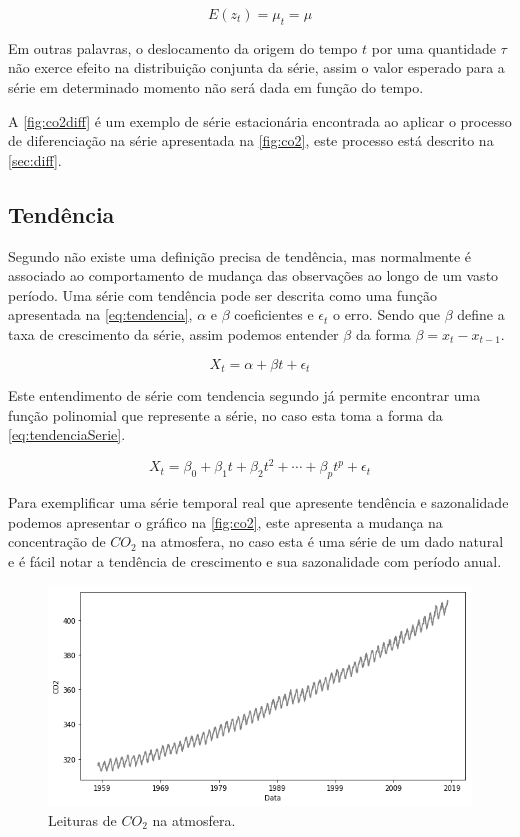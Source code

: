 \documentclass[
    12pt,
    oneside,
    a4paper,
    english,
    brazil
]{abntex2}
\begin{document}
\begin{equation}
    \label{eq:westacionaria}
    E(z_t) = \mu_t = \mu
\end{equation}

Em outras palavras, o deslocamento da origem do tempo $t$ por uma quantidade
$\tau$ não exerce efeito na distribuição conjunta da série, assim o valor
esperado para a série em determinado momento não será dada em função do tempo.

A \autoref{fig:co2diff} é um exemplo de série estacionária encontrada ao
aplicar o processo de diferenciação na série apresentada na \autoref{fig:co2},
este processo está descrito na \autoref{sec:diff}.

\subsection{Tendência}

Segundo  não existe uma definição precisa de tendência, mas
normalmente é associado ao comportamento de mudança das observações ao longo de
um vasto período. Uma série com tendência pode ser descrita como uma função
apresentada na \autoref{eq:tendencia}, $\alpha$ e $\beta{}$ coeficientes e
$\epsilon{}_t$ o erro. Sendo que $\beta{}$ define a taxa de crescimento da
série, assim podemos entender $\beta$ da forma $\beta = x_t - x_{t-1}$.

\begin{equation}
    \label{eq:tendencia}
    X_t = \alpha + \beta{}t + \epsilon{}_t
\end{equation}

Este entendimento de série com tendencia segundo  já permite
encontrar uma função polinomial que represente a série, no caso esta toma a
forma da \autoref{eq:tendenciaSerie}.

\begin{equation}
    \label{eq:tendenciaSerie}
    X_t = \beta_0 + \beta_1t + \beta_2t^2 + \cdots + \beta_{p}t^p + \epsilon_t
\end{equation}

Para exemplificar uma série temporal real que apresente tendência e
sazonalidade podemos apresentar o gráfico na \autoref{fig:co2}, este apresenta
a mudança na concentração de $CO_2$ na atmosfera, no caso esta é uma série de
um dado natural e é fácil notar a tendência de crescimento e sua sazonalidade
com período anual.

\begin{figure}
    \centering
    \caption{Leituras de $CO_2$ na atmosfera.}\label{fig:co2}
    \includegraphics[width=.6\linewidth]{images/co2.png}
\end{figure}
\end{document}
